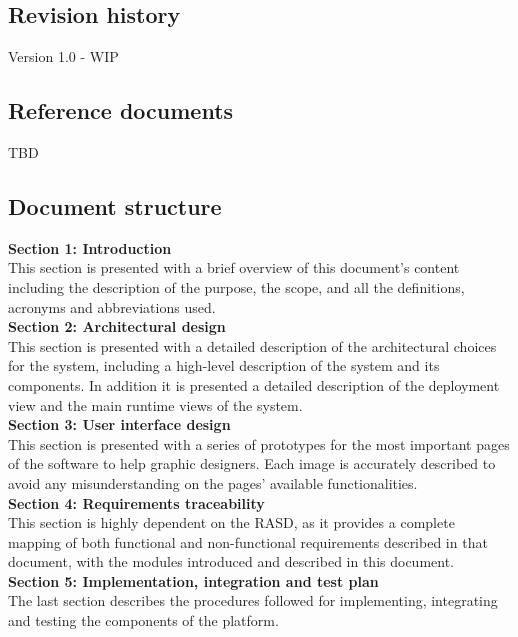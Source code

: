 \documentclass[11pt,twoside]{article}
\begin{document}
	\subsection{Revision history}
Version 1.0 - WIP

	\subsection{Reference documents}
TBD

	\subsection{Document structure}
\textbf{Section 1: Introduction} \\
This section is presented with a brief overview of this document's content including the description of the purpose, the scope, and all the definitions, acronyms and abbreviations used.
\vspace{1\baselineskip} \\
\textbf{Section 2: Architectural design} \\
This section is presented with a detailed description of the architectural choices for the system, including a high-level description of the system and its components. In addition it is presented a detailed description of the deployment view and the main runtime views of the system.
\vspace{1\baselineskip} \\
\textbf{Section 3: User interface design} \\
This section is presented with a series of prototypes for the most important pages of the software to help graphic designers. Each image is accurately described to avoid any misunderstanding on the pages' available functionalities.
\vspace{1\baselineskip} \\
\textbf{Section 4: Requirements traceability} \\
This section is highly dependent on the RASD, as it provides a complete mapping of both functional and non-functional requirements described in that document, with the modules introduced and described in this document.
\vspace{1\baselineskip} \\
\textbf{Section 5: Implementation, integration and test plan} \\
The last section describes the procedures followed for implementing, integrating and testing the components of the platform.
\end{document}
